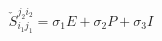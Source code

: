 \begin{equation}
\check{S}_{i_1j_1}^{j_2i_2}=\sigma_1 E+\sigma_2 P+\sigma_3 I \label{maini} 
\end{equation}

